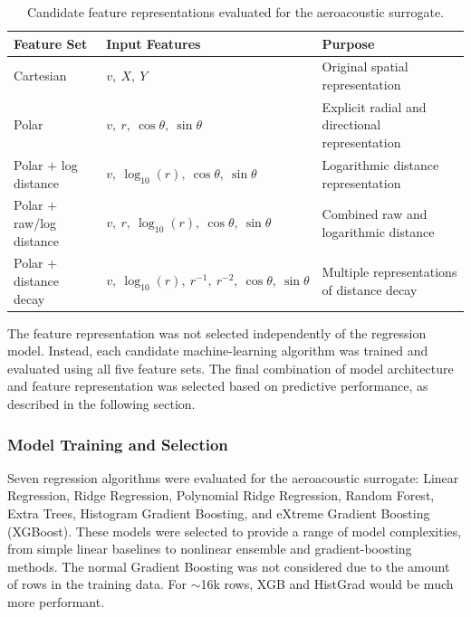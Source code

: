 \documentclass[11pt]{article}
\begin{document}
\begin{table}[htbp]
    \centering
    \caption{Candidate feature representations evaluated for the
    aeroacoustic surrogate.}
    \label{tab:feature-sets}

    \begin{tabularx}{\textwidth}{
        >{\raggedright\arraybackslash}p{}
        >{\raggedright\arraybackslash}X
        >{\raggedright\arraybackslash}X
    }
        \toprule
        \textbf{Feature Set} &
        \textbf{Input Features} &
        \textbf{Purpose} \\
        \midrule

        Cartesian
        & $v,\ X,\ Y$
        & Original spatial representation \\

        Polar
        & $v,\ r,\ \cos\theta,\ \sin\theta$
        & Explicit radial and directional representation \\

        Polar + log distance
        & $v,\ \log_{10}(r),\ \cos\theta,\ \sin\theta$
        & Logarithmic distance representation \\

        Polar + raw/log distance
        & $v,\ r,\ \log_{10}(r),\ \cos\theta,\ \sin\theta$
        & Combined raw and logarithmic distance \\

        Polar + distance decay
        & $v,\ \log_{10}(r),\ r^{-1},\ r^{-2},\
          \cos\theta,\ \sin\theta$
        & Multiple representations of distance decay \\

        \bottomrule
    \end{tabularx}
\end{table}

The feature representation was not selected independently of the regression model. Instead, each candidate machine-learning algorithm was trained and evaluated using all five feature sets. The final combination of model architecture and feature representation was selected based on predictive performance, as described in the following section.

\subsubsection{Model Training and Selection}

Seven regression algorithms were evaluated for the aeroacoustic surrogate: Linear Regression, Ridge Regression, Polynomial Ridge Regression, Random Forest, Extra Trees, Histogram Gradient Boosting, and eXtreme Gradient Boosting (XGBoost). These models were selected to provide a range of model complexities, from simple linear baselines to nonlinear ensemble and gradient-boosting methods. The normal Gradient Boosting was not considered due to the amount of rows in the training data. For $\sim$16k rows, XGB and HistGrad would be much more performant.
\end{document}
